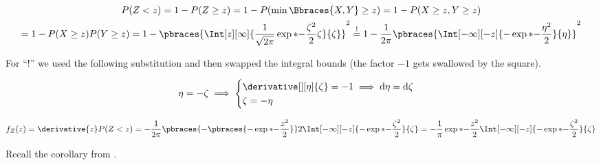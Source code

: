 \begin{solution}

\begin{multline*}
    P(Z < z)
    =
    1 - P(Z \geq z)
    =
    1 - P(\min \Bbraces{X, Y} \geq z)
    =
    1 - P(X \geq z, Y \geq z) \\
    =
    1 - P(X \geq z) P(Y \geq z)
    =
    1 - \pbraces{\Int[z][\infty]{\frac{1}{\sqrt{2 \pi}} \exp*{-\frac{\zeta^2}{2}}{\zeta}}{\zeta}}^2
    \stackrel{!}{=}
    1 - \frac{1}{2 \pi} \pbraces{\Int[-\infty][-z]{-\exp*{-\frac{\eta^2}{2}}}{\eta}}^2
\end{multline*}

For \enquote{!} we used the following substitution and then swapped the integral bounds (the factor $-1$ gets swallowed by the square).

\begin{align*}
    \eta = -\zeta
    \implies
    \begin{cases}
        \derivative[][\eta]{\zeta} = -1 \implies \mathrm d \eta = \mathrm d \zeta \\
        \zeta = -\eta
    \end{cases}
\end{align*}

\begin{align*}
    f_Z(z)
    =
    \derivative{z}
        P(Z < z)
    =
    -\frac{1}{2 \pi}
    \pbraces
    {
        -
        \pbraces
        {
            -\exp*{-\frac{z^2}{2}}
        }
    }
    2
    \Int[-\infty][-z]
    {
        -\exp*{-\frac{\zeta^2}{2}}
    }{\zeta}
    =
    -\frac{1}{\pi}
    \exp*{-\frac{z^2}{2}}
    \Int[-\infty][-z]
    {
        -\exp*{-\frac{\zeta^2}{2}}
    }{\zeta}
\end{align*}

Recall the corollary from \cite[Lecture 3, Slide 42]{EStat}.


\end{solution}
